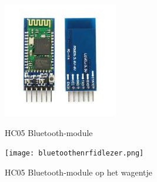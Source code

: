 \begin{figure}[H]
	\centering
	\begin{minipage}[b]{0.4\textwidth}
		\centering
		\includegraphics[height=5cm]{hc05.png}
		\caption{HC05 Bluetooth-module\label{fig:hc05}}
	\end{minipage}
	\hfill
	\begin{minipage}[b]{0.4\textwidth}
		\centering
		\texttt{[image: bluetoothenrfidlezer.png]}
		\caption{HC05 Bluetooth-module op het wagentje\label{fig:hc05montage}}
	\end{minipage}
\end{figure}

